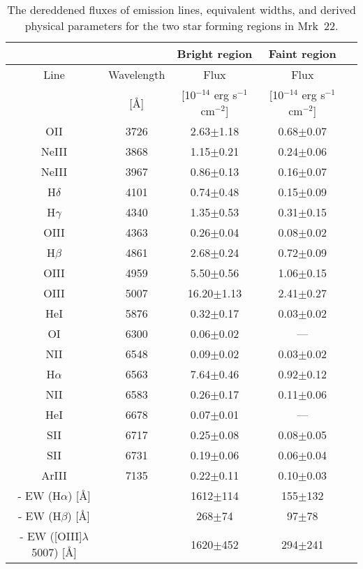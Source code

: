 \documentclass[useAMS,usenatbib]{mn2e}
\begin{document}
\begin{table*}\label{tab:02}
\centering
\caption{The dereddened fluxes of emission lines, equivalent widths, and derived physical parameters for the two star forming regions in Mrk~22.}
\begin{tabular}{c|c|c|c|c}
\hline
       &      & Bright region   & Faint region\\
\hline
Line  & Wavelength  & Flux & Flux\\
      &  [\AA]  & [10$^{-14}$ erg s$^{-1}$ cm$^{-2}$] & [10$^{-14}$ erg s$^{-1}$ cm$^{-2}$]\\
\hline
O{\sc II}   & 3726 &   2.63$\pm$1.18 & 0.68$\pm$0.07\\
Ne{\sc III} & 3868 &   1.15$\pm$0.21 & 0.24$\pm$0.06\\
Ne{\sc III} & 3967 &   0.86$\pm$0.13 & 0.16$\pm$0.07\\
H$\delta$  & 4101  &   0.74$\pm$0.48 & 0.15$\pm$0.09\\
H$\gamma$  & 4340  &   1.35$\pm$0.53 & 0.31$\pm$0.15\\
O{\sc III}  & 4363 &   0.26$\pm$0.04 & 0.08$\pm$0.02\\
H$\beta$   & 4861  &   2.68$\pm$0.24 & 0.72$\pm$0.09\\
O{\sc III} & 4959  &   5.50$\pm$0.56 & 1.06$\pm$0.15\\
O{\sc III} & 5007  &  16.20$\pm$1.13 & 2.41$\pm$0.27\\
He{\sc I}  & 5876  &   0.32$\pm$0.17 & 0.03$\pm$0.02\\
O{\sc I}   & 6300  &   0.06$\pm$0.02 & ---\\
N{\sc II}  & 6548  &   0.09$\pm$0.02 & 0.03$\pm$0.02\\
H$\alpha$  & 6563  &   7.64$\pm$0.46 & 0.92$\pm$0.12\\
N{\sc II}  & 6583  &   0.26$\pm$0.17 & 0.11$\pm$0.06\\
He{\sc I}  & 6678  &   0.07$\pm$0.01 & ---\\
S{\sc II}  & 6717  &   0.25$\pm$0.08 & 0.08$\pm$0.05\\
S{\sc II}  & 6731  &   0.19$\pm$0.06 & 0.06$\pm$0.04\\  
Ar{\sc III} & 7135 &   0.22$\pm$0.11 & 0.10$\pm$0.03\\
\hline
- EW (H$\alpha$) [\AA] && 1612$\pm$114 & 155$\pm$132\\
- EW (H$\beta$) [\AA] && 268$\pm$74 & 97$\pm$78\\
- EW ([O{\small{III}}]$\lambda$5007) [\AA] && 1620$\pm$452 & 294$\pm$241\\

\end{tabular}
\end{table*}
\end{document}
